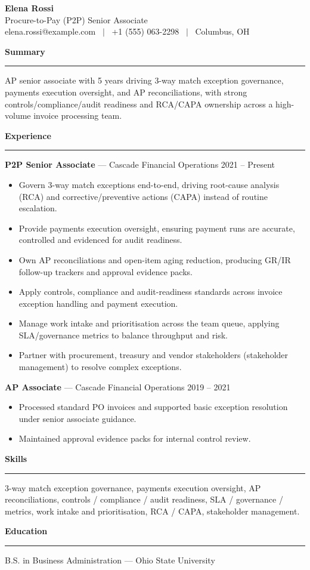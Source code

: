 \documentclass[11pt]{article}
\newcommand{\rsection}[1]{%
  \vspace{10pt}
  {\large\bfseries #1}\\[-4pt]
  \rule{\linewidth}{0.6pt}\vspace{4pt}
}
\begin{document}
\begin{center}
  {\Huge\bfseries Elena Rossi}\\[4pt]
  Procure-to-Pay (P2P) Senior Associate \\
  elena.rossi@example.com \ $\vert$ \ +1 (555) 063-2298 \ $\vert$ \ Columbus, OH
\end{center}

\rsection{Summary}
AP senior associate with 5 years driving 3-way match exception governance, payments execution oversight, and AP reconciliations, with strong controls/compliance/audit readiness and RCA/CAPA ownership across a high-volume invoice processing team.

\rsection{Experience}
\textbf{P2P Senior Associate} --- Cascade Financial Operations \hfill 2021 -- Present
\begin{itemize}
  \item Govern 3-way match exceptions end-to-end, driving root-cause analysis (RCA) and corrective/preventive actions (CAPA) instead of routine escalation.
  \item Provide payments execution oversight, ensuring payment runs are accurate, controlled and evidenced for audit readiness.
  \item Own AP reconciliations and open-item aging reduction, producing GR/IR follow-up trackers and approval evidence packs.
  \item Apply controls, compliance and audit-readiness standards across invoice exception handling and payment execution.
  \item Manage work intake and prioritisation across the team queue, applying SLA/governance metrics to balance throughput and risk.
  \item Partner with procurement, treasury and vendor stakeholders (stakeholder management) to resolve complex exceptions.
\end{itemize}

\textbf{AP Associate} --- Cascade Financial Operations \hfill 2019 -- 2021
\begin{itemize}
  \item Processed standard PO invoices and supported basic exception resolution under senior associate guidance.
  \item Maintained approval evidence packs for internal control review.
\end{itemize}

\rsection{Skills}
3-way match exception governance, payments execution oversight, AP reconciliations, controls / compliance / audit readiness, SLA / governance / metrics, work intake and prioritisation, RCA / CAPA, stakeholder management.

\rsection{Education}
B.S. in Business Administration --- Ohio State University
\end{document}

